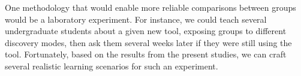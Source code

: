 \documentclass[smallextended]{svjour3}
\newcommand\discovery{peer interaction\xspace}
\newcommand\contexts{modes\xspace}
\begin{document}
One methodology that would enable more reliable comparisons between
groups would be a laboratory experiment.
For instance, we could teach several undergraduate
students about a given new tool, exposing groups to different 
discovery \contexts, then ask them
several weeks later if they were still using the tool.
Fortunately, based on the results from the present studies, 
we can craft several realistic learning scenarios for such an experiment.

% 
% 
% 

\end{document}
